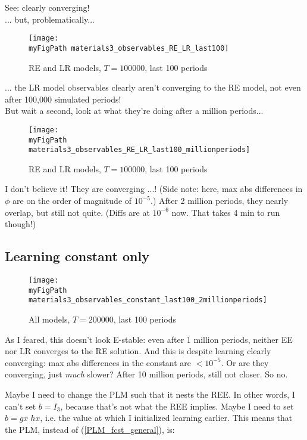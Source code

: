 \documentclass[11pt]{article}
\def \myFigPath {../figures/}
\renewcommand{\[}{\begin{equation}}
\renewcommand{\]}{\end{equation}}
\def\myFigScale{0.3}
\begin{document}
See: clearly converging!  \\

... but, problematically...

\newpage

\begin{figure}[h!]
\texttt{[image: \\myFigPath materials3\_observables\_RE\_LR\_last100]}
\caption{RE and LR models, $T = 100000$, last 100 periods}
\end{figure}

... the LR model observables clearly aren't converging to the RE model, not even after 100,000 simulated periods! \\
But wait a second, look at what they're doing after a million periods...
\begin{figure}[h!]
\texttt{[image: \\myFigPath materials3\_observables\_RE\_LR\_last100\_millionperiods]}
\caption{RE and LR models, $T = 100000$, last 100 periods}
\end{figure}

I don't believe it! They are converging ...! (Side note: here, max abs differences in $\phi$ are on the order of magnitude of $10^{-5}$.) After 2 million periods, they nearly overlap, but still not quite. (Diffs are at $10^{-6}$ now. That takes 4 min to run though!)

\newpage
\subsection{Learning constant only}

 \begin{figure}[h!]
\texttt{[image: \\myFigPath materials3\_observables\_constant\_last100\_2millionperiods]}
\caption{All models, $T = 200000$, last 100 periods}
\end{figure}
 
 As I feared, this doesn't look E-stable: even after 1 million periods, neither EE nor LR converges to the RE solution. And this is despite learning clearly converging: max abs differences in the constant are $<10^{-5}$. Or are they converging, just \emph{much} slower? After 10 million periods, still not closer. So no.
 
 Maybe I need to change the PLM such that it nests the REE. In other words, I can't set $b = I_3$, because that's not what the REE implies. Maybe I need to set $b=gx\;hx$, i.e. the value at which I initialized learning earlier. This means that the PLM, instead of (\ref{PLM_fcst_general}), is:
 
\end{document}
